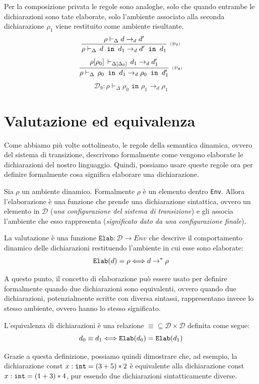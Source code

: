 \documentclass[oneside,a4paper,11pt]{book}
\theoremstyle{italicstyle}
\theoremstyle{normStyle}
\begin{document}
Per la composizione privata le regole sono analoghe, solo che quando entrambe le dichiarazioni sono tate elaborate, solo 
l'ambiente associato alla seconda dichiarazione $\rho_1$ viene restituito 
come ambiente risultante.
\[
  \infer[\scriptscriptstyle (\mathcal{D}_{7})]
    {
      \rho \vdash_\Delta\,d \texttt{ in }d_1 \rightarrow_d d' \texttt{ in }d_1
    }
    {
      \rho \vdash_\Delta d \rightarrow_d d'
    }
\]
\[
  \infer[\scriptscriptstyle (\mathcal{D}_{8})]
    {
      \rho \vdash_\Delta\,\rho_0 \texttt{ in }d_1 \rightarrow_d \rho_0 \texttt{ in }d_1'
    }
    {
      \rho[\rho_0]\,\vdash_{\Delta[\Delta_0]}\,d_1 \rightarrow_d d_1'
    }
\]
\[
  \mathcal{D}_9: \rho \vdash_\Delta \rho_0 \texttt{ in }\rho_1 \rightarrow_d \rho_1
\]
\section{Valutazione ed equivalenza}
Come abbiamo più volte sottolineato, le regole della semantica dinamica,
ovvero del sistema di transizione, descrivono formalmente come vengono
elaborate le dichiarazioni del nostro linguaggio. Quindi, possiamo
usare queste regole ora per definire formalmente cosa significa
elaborare una dichiarazione.

Sia $\rho$ un ambiente dinamico. Formalmente $\rho$ è un elemento
dentro \verb|Env|. Allora l’elaborazione è una funzione che prende
una dichiarazione sintattica, ovvero un elemento in $\mathcal{D}$ (\textit{una
configurazione del sistema di transizione}) e gli
associa l’ambiente che esso rappresenta 
(\textit{significato dato da una configurazione finale}).
\begin{tcolorbox}[title = {Elaborazione delle dichiarazioni}]
  La valutazione è una funzione $\texttt{Elab}: \mathcal{D} \rightarrow \textit{Env}$ che
  descrive il comportamento dinamico delle dichiarazioni
  restituendo l’ambiente in cui esse sono elaborate:
  \[
    \verb|Elab|(d)=\rho \Longleftrightarrow d \rightarrow^* \rho
  \]
\end{tcolorbox}
A questo punto, il concetto di elaborazione può essere usato per
definire formalmente quando due dichiarazioni sono equivalenti,
ovvero quando due dichiarazioni, potenzialmente scritte con diversa
sintassi, rappresentano invece lo stesso ambiente, ovvero hanno lo
stesso significato.
\begin{tcolorbox}[title = {Equivalenza di dichiarazioni}]
  L'equivalenza di dichiarazioni è una relazione $\equiv \subseteq \mathcal{D} \times \mathcal{D}$
  definita come segue:
  \[
    d_0 \equiv d_1 \Longleftrightarrow \verb|Elab|(d_0)=\verb|Elab|(d_1)
  \]
\end{tcolorbox}
Grazie a questa definizione, possiamo quindi dimostrare che,
ad esempio, la dichiarazione const $x:\verb|int|=(3+5)*2$ è equivalente
alla dichiarazione const $x:\verb|int|=(1+3)*4$, pur essendo due dichiarazioni
sintatticamente diverse.
\end{document}
